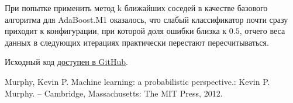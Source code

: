 \documentclass[a4paper,12pt]{article} %
\begin{document}
При попытке применить метод k ближайших соседей в качестве базового алгоритма для AdaBoost.M1 оказалось, что слабый классификатор почти сразу приходит к конфигурации, при которой доля ошибки близка к $0.5$, отчего веса данных в следующих итерациях практически перестают пересчитываться.

Исходный код \href{https://github.com/zuevval/source/tree/master/r/ml/boosting}{доступен в GitHub}.


\begin{thebibliography}{99}
	 Murphy, Kevin P. Machine learning: a probabilistic perspective.: Kevin P. Murphy. -- Cambridge, Massachusetts: The MIT Press, 2012.
\end{thebibliography}	
	
\end{document}
